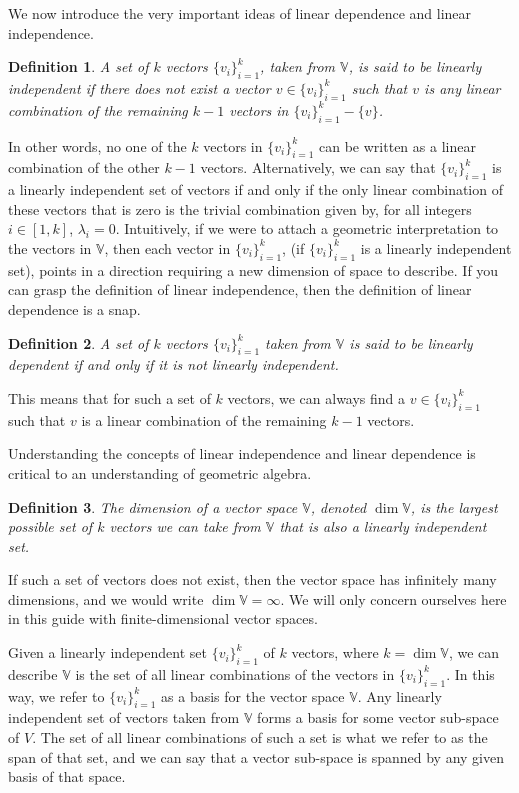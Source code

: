 \documentclass[12pt]{article}
\numberwithin{equation}{section}
\newcommand{\V}{\mathbb{V}}
\newtheorem{definition}{Definition}[section]
\begin{document}
We now introduce the very important ideas of linear dependence and linear independence.

\begin{definition}
A set of $k$ vectors $\{v_i\}_{i=1}^k$, taken from $\V$, is said to be linearly
independent if there does not exist a vector $v\in\{v_i\}_{i=1}^k$ such that
$v$ is any linear combination of the remaining $k-1$ vectors in $\{v_i\}_{i=1}^k-\{v\}$.
\end{definition}

In other words, no one of the $k$ vectors in $\{v_i\}_{i=1}^k$ can be
written as a linear combination of the other $k-1$ vectors.  Alternatively, we can
say that $\{v_i\}_{i=1}^k$ is a linearly independent set of vectors if and only if
the only linear combination of these vectors that is zero is the trivial combination
given by, for all integers $i\in[1,k]$, $\lambda_i=0$.  Intuitively, if
we were to attach a geometric interpretation to the vectors in $\V$, then
each vector in $\{v_i\}_{i=1}^k$, (if $\{v_i\}_{i=1}^k$ is a linearly independent set), points
in a direction requiring a new dimension of space to describe.  If you can grasp the
definition of linear independence, then the definition of linear dependence
is a snap.

\begin{definition}
A set of $k$ vectors $\{v_i\}_{i=1}^k$ taken from $\V$ is said to be linearly
dependent if and only if it is not linearly independent.
\end{definition}

This means that for such a set of $k$ vectors, we can always find a $v\in\{v_i\}_{i=1}^k$
such that $v$ is a linear combination of the remaining $k-1$ vectors.

Understanding the concepts of linear independence and linear dependence is
critical to an understanding of geometric algebra.

\begin{definition}
The dimension of a vector space $\V$, denoted $\dim\V$, is the largest
possible set of $k$ vectors we can take from $\V$ that is also a linearly
independent set.
\end{definition}

If such a set of vectors does not exist, then the vector space has
infinitely many dimensions, and we would write $\dim\V=\infty$.
We will only concern ourselves here in this
guide with finite-dimensional vector spaces.

Given a linearly independent set $\{v_i\}_{i=1}^k$ of $k$ vectors, where $k=\dim\V$,
we can describe $\V$ is the set of all linear combinations of the vectors in $\{v_i\}_{i=1}^k$.
In this way, we refer to $\{v_i\}_{i=1}^k$ as a basis for the vector space $\V$.
Any linearly independent set of vectors taken from $\V$ forms a basis for some
vector sub-space of $V$.  The set of all linear combinations of such a set is
what we refer to as the span of that set, and we can say that a vector sub-space
is spanned by any given basis of that space.
\end{document}
